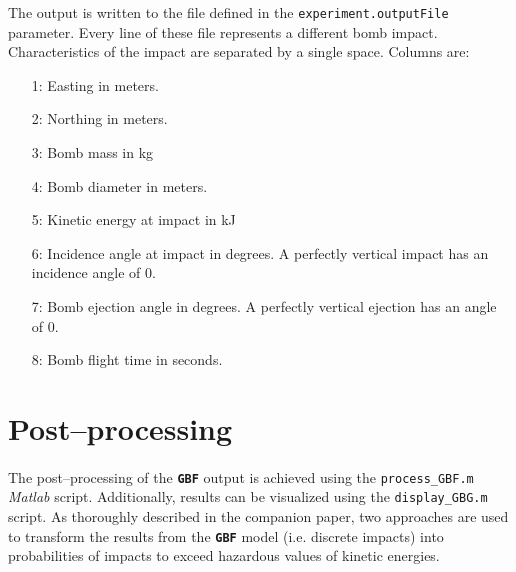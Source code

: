 \documentclass[10pt,a4paper]{article}
\begin{document}
The output is written to the file defined in the
\texttt{experiment.outputFile} parameter. Every line of these file represents
a different bomb impact. Characteristics of the impact are separated by a single
space. Columns are:

\begin{itemize}[leftmargin=1.5cm,labelindent=16pt, itemsep=0.25pt]
\item[\textsf{\color{namecolor}1:}]  Easting in meters.
\item[\textsf{\color{namecolor}2:}]  Northing in meters.
\item[\textsf{\color{namecolor}3:}]  Bomb mass in kg
\item[\textsf{\color{namecolor}4:}]  Bomb diameter in meters.
\item[\textsf{\color{namecolor}5:}]  Kinetic energy at impact in kJ
\item[\textsf{\color{namecolor}6:}]  Incidence angle at impact in degrees. A perfectly vertical impact has an incidence angle of 0.
\item[\textsf{\color{namecolor}7:}]  Bomb ejection angle in degrees. A perfectly vertical ejection has an angle of 0.
\item[\textsf{\color{namecolor}8:}]  Bomb flight time in seconds.
\end{itemize}



\section{Post--processing}
\paragraph{}The post--processing of the \textbf{\texttt{\textsf{\color{namecolor}GBF}}} output is achieved using the \texttt{process\_GBF.m} \textit{Matlab} script. Additionally, results can be visualized using the \texttt{display\_GBG.m} script. As thoroughly described in the companion paper, two approaches are used to transform the results from the \textbf{\texttt{\textsf{\color{namecolor}GBF}}} model (i.e. discrete impacts) into probabilities of impacts to exceed hazardous values of kinetic energies.
\end{document}
